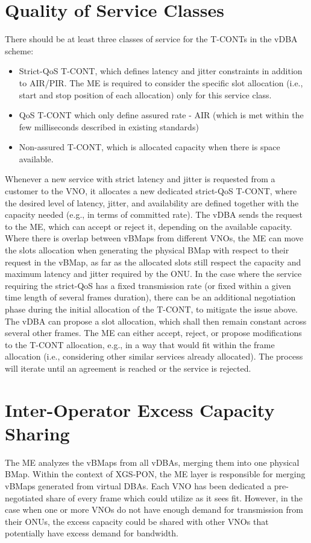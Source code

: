\section{Quality of Service Classes} There should be at least three classes of service for the \acp{T-CONT} in the \ac{vDBA} scheme:
\begin{itemize}
    \item Strict-\ac{QoS} \ac{T-CONT}, which defines latency and jitter constraints in addition to AIR/PIR. The \ac{ME} is required to consider the specific slot allocation (i.e., start and stop position of each allocation) only for this service class.
    \item \ac{QoS} \ac{T-CONT} which only define assured rate - AIR (which is met within the few milliseconds described in existing standards) 
    \item Non-assured \ac{T-CONT}, which is allocated capacity when there is space available.
\end{itemize}

 Whenever a new service with strict latency and jitter is requested from a customer to the \ac{VNO}, it allocates a new dedicated strict-\ac{QoS} \ac{T-CONT}, where the desired level of latency, jitter, and availability are defined together with the capacity needed (e.g., in terms of committed rate). The \ac{vDBA} sends the request to the \ac{ME}, which can accept or reject it, depending on the available capacity. Where there is overlap between \acp{vBMap} from different \acp{VNO}, the \ac{ME} can move the slots allocation when generating the physical \ac{BMap} with respect to their request in the \ac{vBMap}, as far as the allocated slots still respect the capacity and maximum latency and jitter required by the \ac{ONU}. In the case where the service requiring the strict-\ac{QoS} has a fixed transmission rate (or fixed within a given time length of several frames duration), there can be an additional negotiation phase during the initial allocation of the \ac{T-CONT}, to mitigate the issue above. The \ac{vDBA} can propose a slot allocation, which shall then remain constant across several other frames. The \ac{ME} can either accept, reject, or propose modifications to the \ac{T-CONT} allocation, e.g., in a way that would fit within the frame allocation (i.e., considering other similar services already allocated). The process will iterate until an agreement is reached or the service is rejected.



\section{Inter-Operator Excess Capacity Sharing}
The \ac{ME} analyzes the \acp{vBMap} from all \acp{vDBA}, merging them into one physical \ac{BMap}. Within the context of XGS-PON, the \ac{ME} layer is responsible for merging \acp{vBMap} generated from virtual \acp{DBA}. Each \ac{VNO} has been dedicated a pre-negotiated share of every frame which could utilize as it sees fit. However, in the case when one or more \acp{VNO} do not have enough demand for transmission from their \acp{ONU}, the excess capacity could be shared with other \acp{VNO} that potentially have excess demand for bandwidth.

